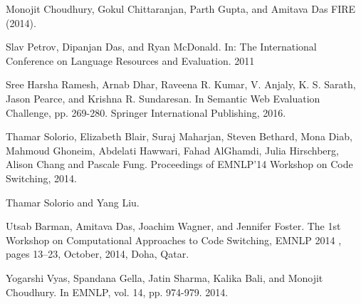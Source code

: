 \documentclass[11pt,a4paper]{article}
\begin{document}
\begin{thebibliography}{}


Monojit Choudhury, Gokul Chittaranjan, Parth Gupta, and Amitava Das
\newblock FIRE (2014).

Slav Petrov, Dipanjan Das, and Ryan McDonald.
\newblock In: The International Conference on Language Resources and Evaluation. 2011

Sree Harsha Ramesh, Arnab Dhar, Raveena R. Kumar, V. Anjaly, K. S. Sarath, Jason Pearce, and Krishna R. Sundaresan.
\newblock In Semantic Web Evaluation Challenge, pp. 269-280. Springer International Publishing, 2016.

Thamar Solorio, Elizabeth Blair, Suraj Maharjan, Steven Bethard, Mona Diab, Mahmoud Ghoneim, Abdelati Hawwari, Fahad AlGhamdi, Julia Hirschberg, Alison Chang and Pascale Fung.
\newblock Proceedings of EMNLP'14 Workshop on Code Switching, 2014.

Thamar Solorio and Yang Liu.

Utsab Barman, Amitava Das, Joachim Wagner, and Jennifer Foster.
\newblock The 1st Workshop on Computational Approaches to Code Switching, EMNLP 2014 , pages 13–23, October, 2014, Doha, Qatar.  

Yogarshi Vyas, Spandana Gella, Jatin Sharma, Kalika Bali, and Monojit Choudhury.
\newblock In EMNLP, vol. 14, pp. 974-979. 2014.

\end{thebibliography}
\end{document}
